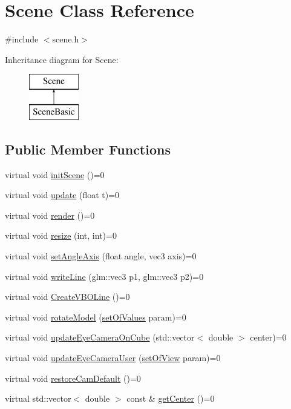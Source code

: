 \hypertarget{class_scene}{}\section{Scene Class Reference}
\label{class_scene}


{\ttfamily \#include $<$scene.\+h$>$}

Inheritance diagram for Scene\+:\begin{figure}[H]
\begin{center}
\leavevmode
\includegraphics[height=2.000000cm]{class_scene}
\end{center}
\end{figure}
\subsection*{Public Member Functions}
\begin{DoxyCompactItemize}
\item 
virtual void \hyperlink{class_scene_ae76b830c1156bb40bd744afb63776be2}{init\+Scene} ()=0
\item 
virtual void \hyperlink{class_scene_aafa9ccf4d019005fdd41672afd13a7a9}{update} (float t)=0
\item 
virtual void \hyperlink{class_scene_a823f4cd60d27932ee16f74adb0421ff6}{render} ()=0
\item 
virtual void \hyperlink{class_scene_a454bd0a09c125201fbb32e15d4f62fa3}{resize} (int, int)=0
\item 
virtual void \hyperlink{class_scene_ab0c59864d813f7d11a2d362acfdd0e26}{set\+Angle\+Axis} (float angle, vec3 axis)=0
\item 
virtual void \hyperlink{class_scene_a0813a564a23d9a2d0a965d5bf422c1fd}{write\+Line} (glm\+::vec3 p1, glm\+::vec3 p2)=0
\item 
virtual void \hyperlink{class_scene_a2e371aa848e8c30f593c2d9a2687dd28}{Create\+V\+B\+O\+Line} ()=0
\item 
virtual void \hyperlink{class_scene_af0c5ec79be9fbb4a6a2554ac4aaaf473}{rotate\+Model} (\hyperlink{structset_of_values}{set\+Of\+Values} param)=0
\item 
virtual void \hyperlink{class_scene_a04ae3637cb26c4ad95004372d5a63654}{update\+Eye\+Camera\+On\+Cube} (std\+::vector$<$ double $>$ center)=0
\item 
virtual void \hyperlink{class_scene_a52181459b75a0c2f4706a26f3e200ca1}{update\+Eye\+Camera\+User} (\hyperlink{structset_of_view}{set\+Of\+View} param)=0
\item 
virtual void \hyperlink{class_scene_a74dc104a3f44abf1f09d7b627c9baa36}{restore\+Cam\+Default} ()=0
\item 
virtual std\+::vector$<$ double $>$ const  \& \hyperlink{class_scene_a15d25044dbd65a8d7d0759888fcd55a1}{get\+Center} ()=0
\end{DoxyCompactItemize}


